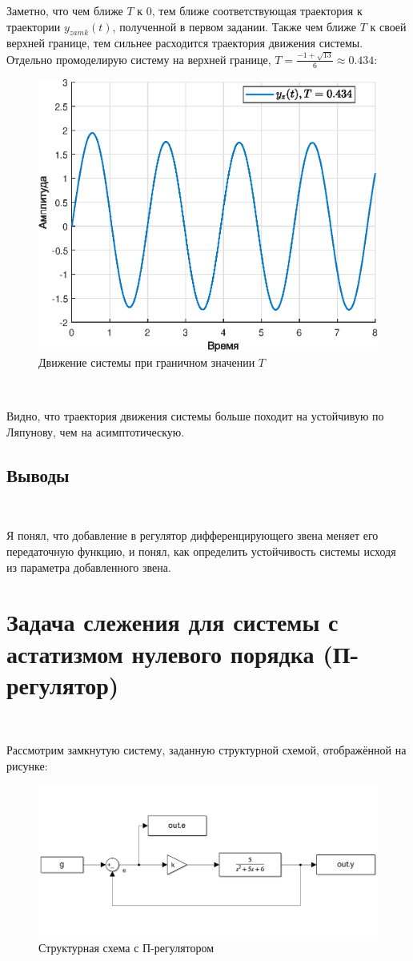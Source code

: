 \documentclass[a4paper]{article}
\begin{document}
Заметно, что чем ближе $T$ к 0, тем ближе соответствующая траектория к траектории $y_{zamk}(t)$, полученной в первом задании. Также чем ближе $T$ к своей верхней границе, тем сильнее расходится траектория движения системы. Отдельно промоделирую систему на верхней границе, $T = \frac{-1 + \sqrt{13}}{6}\approx 0.434$:

\begin{figure}[H]
    \centering
    \includegraphics[width=0.65\linewidth]{ex2/0.434.eps}
    \caption{Движение системы при граничном значении $T$}
\end{figure}\

Видно, что траектория движения системы больше походит на устойчивую по Ляпунову, чем на асимптотическую.

\subsection{Выводы}\

Я понял, что добавление в регулятор дифференцирующего звена меняет его передаточную функцию, и понял, как определить устойчивость системы исходя из параметра добавленного звена. 

\section{Задача слежения для системы с астатизмом нулевого порядка (П-регулятор)}\

Рассмотрим замкнутую систему, заданную структурной схемой, отображённой на рисунке:

\begin{figure}[H]
    \centering
    \includegraphics[width=0.65\linewidth]{ex3/image.png}
    \caption{Структурная схема с П-регулятором}
\end{figure}\
\end{document}
